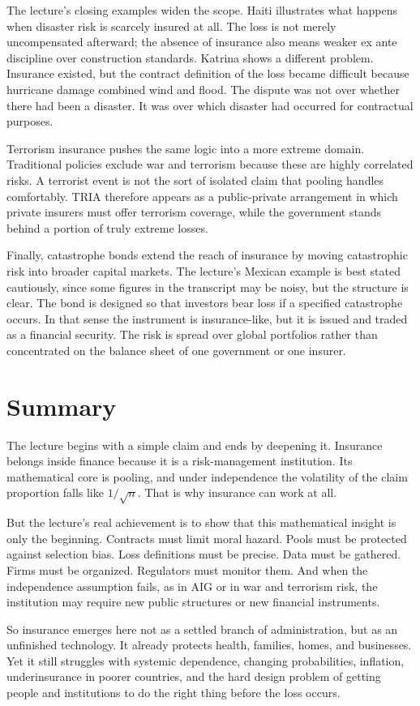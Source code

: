 The lecture's closing examples widen the scope. Haiti illustrates what happens when disaster risk is scarcely insured at all. The loss is not merely uncompensated afterward; the absence of insurance also means weaker ex ante discipline over construction standards. Katrina shows a different problem. Insurance existed, but the contract definition of the loss became difficult because hurricane damage combined wind and flood. The dispute was not over whether there had been a disaster. It was over which disaster had occurred for contractual purposes.

Terrorism insurance pushes the same logic into a more extreme domain. Traditional policies exclude war and terrorism because these are highly correlated risks. A terrorist event is not the sort of isolated claim that pooling handles comfortably. TRIA therefore appears as a public-private arrangement in which private insurers must offer terrorism coverage, while the government stands behind a portion of truly extreme losses.

Finally, catastrophe bonds extend the reach of insurance by moving catastrophic risk into broader capital markets. The lecture's Mexican example is best stated cautiously, since some figures in the transcript may be noisy, but the structure is clear. The bond is designed so that investors bear loss if a specified catastrophe occurs. In that sense the instrument is insurance-like, but it is issued and traded as a financial security. The risk is spread over global portfolios rather than concentrated on the balance sheet of one government or one insurer.

\section{Summary}

The lecture begins with a simple claim and ends by deepening it. Insurance belongs inside finance because it is a risk-management institution. Its mathematical core is pooling, and under independence the volatility of the claim proportion falls like \(1/\sqrt{n}\). That is why insurance can work at all.

But the lecture's real achievement is to show that this mathematical insight is only the beginning. Contracts must limit moral hazard. Pools must be protected against selection bias. Loss definitions must be precise. Data must be gathered. Firms must be organized. Regulators must monitor them. And when the independence assumption fails, as in AIG or in war and terrorism risk, the institution may require new public structures or new financial instruments.

So insurance emerges here not as a settled branch of administration, but as an unfinished technology. It already protects health, families, homes, and businesses. Yet it still struggles with systemic dependence, changing probabilities, inflation, underinsurance in poorer countries, and the hard design problem of getting people and institutions to do the right thing before the loss occurs.